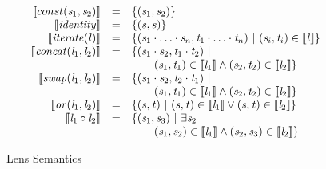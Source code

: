 \begin{figure}
\[
\begin{array}{rcl}
\SemanticsOf{const(\String_1,\String_2)} &=& \SetOf{(\String_1,\String_2)}\\

\SemanticsOf{\IdentityLens} &=& \SetOf{(\String,\String)}\\

\SemanticsOf{\IterateLens{\Lens}} &=& \SetOf{(\String_1\Concat\ldots\Concat\String_n,
\StringAlt_1\Concat\ldots\Concat\StringAlt_n)\SuchThat
(\String_i,\StringAlt_i)\in\SemanticsOf{\Lens}}\\

\SemanticsOf{\ConcatLens{\Lens_1}{\Lens_2}} &=&
\SetOf{(\String_1\Concat\String_2,\StringAlt_1\Concat\StringAlt_2)\SuchThat\\
& & \hspace*{2em}(\String_1,\StringAlt_1)\in\SemanticsOf{\Lens_1}\BooleanAnd
(\String_2,\StringAlt_2)\in\SemanticsOf{\Lens_2}}\\

\SemanticsOf{\SwapLens{\Lens_1}{\Lens_2}} &=&
\SetOf{(\String_1\Concat\String_2,\StringAlt_2\Concat\StringAlt_1)\SuchThat\\
& & \hspace*{2em}(\String_1,\StringAlt_1)\in\SemanticsOf{\Lens_1}\BooleanAnd
(\String_2,\StringAlt_2)\in\SemanticsOf{\Lens_2}}\\

\SemanticsOf{\OrLens{\Lens_1}{\Lens_2}} &=&
\SetOf{(\String,\StringAlt)
\SuchThat(\String,\StringAlt)\in\SemanticsOf{\Lens_1}
\BooleanOr(\String,\StringAlt)\in\SemanticsOf{\Lens_2}}\\

\SemanticsOf{\ComposeLens{\Lens_1}{\Lens_2}} &=&
\SetOf{(\String_1,\String_3)\SuchThat\exists\String_2\\
& & \hspace*{2em}(\String_1,\String_2)\in\SemanticsOf{\Lens_1}\BooleanAnd
(\String_2,\String_3)\in\SemanticsOf{\Lens_2}}
\end{array}
\]
\caption{Lens Semantics}
\label{fig:lens-semantics}
\end{figure}

